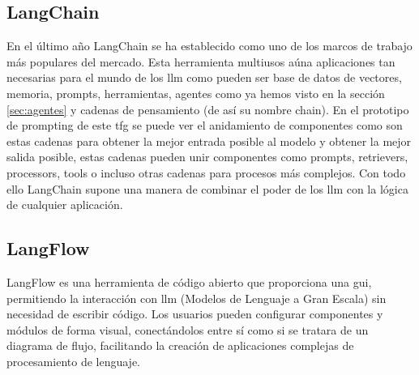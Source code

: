 	\subsection{LangChain}
	En el último año LangChain se ha establecido como uno de los marcos de trabajo más populares del mercado. Esta herramienta multiusos aúna aplicaciones tan necesarias para el mundo de los \acrfull{llm} como pueden ser base de datos de vectores, memoria, prompts, herramientas, agentes como ya hemos visto en la sección \ref{sec:agentes} y cadenas de pensamiento (de así su nombre chain). En el prototipo de prompting de este \acrshort{tfg} se puede ver el anidamiento de componentes como son estas cadenas para obtener la mejor entrada posible al modelo y obtener la mejor salida posible, estas cadenas pueden unir componentes como prompts, retrievers, processors, tools o incluso otras cadenas para procesos más complejos.
	Con todo ello LangChain supone una manera de combinar el poder de los \acrshort{llm} con la lógica de cualquier aplicación.
	
	\subsection{LangFlow}
	LangFlow es una herramienta de código abierto\cite{langflow} que proporciona una \acrfull{gui}, permitiendo la interacción con \acrlong{llm} (Modelos de Lenguaje a Gran Escala) sin necesidad de escribir código. Los usuarios pueden configurar componentes y módulos de forma visual, conectándolos entre sí como si se tratara de un diagrama de flujo, facilitando la creación de aplicaciones complejas de procesamiento de lenguaje.
	
